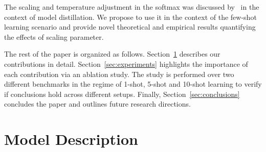 \documentclass{article}
\begin{document}
The scaling and temperature adjustment in the softmax was discussed by~\citet{hinton2015distilling} in the context of model distillation. We propose to use it in the context of the few-shot learning scenario and provide novel theoretical and empirical results quantifying the effects of scaling parameter.

The rest of the paper is organized as follows. Section~\ref{sec:model} describes our contributions in detail. Section~\ref{sec:experiments} highlights the importance of each contribution via an ablation study. The study is performed over two different benchmarks in the regime of 1-shot, 5-shot and 10-shot learning to verify if conclusions hold across different setups. Finally, Section~\ref{sec:conclusions} concludes the paper and outlines future research directions.

\section{Model Description}\label{sec:model}
\end{document}

